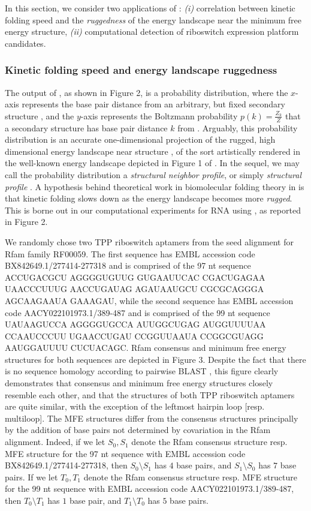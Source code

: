 In this section, we consider two applications of \fftbor:
{\em (i)} correlation between kinetic folding speed and the {\em ruggedness}
of the energy landscape near the minimum free energy structure,
{\em (ii)} computational detection of riboswitch
expression platform candidates.

\subsubsection*{Kinetic folding speed and energy landscape ruggedness}

The output of \fftbor, as shown in
Figure 2, is a probability distribution,
where the $x$-axis represents the base pair distance from an arbitrary,
but fixed secondary structure \strSt, and the $y$-axis represents the
Boltzmann probability $p(k) = \frac{Z_k}{Z}$ that a secondary structure
has base pair distance $k$ from \strSt. Arguably, this probability distribution
is an accurate one-dimensional projection of the rugged, high dimensional energy
landscape near structure \strSt,
of the sort artistically rendered in the well-known
energy landscape depicted in Figure 1  of \cite{Wolynes.ptam05}.
In the sequel, we may call the \fftbor probability distribution a
{\em structural neighbor profile}, or simply {\em structural profile}
\strSt.
A hypothesis behind theoretical work in biomolecular folding theory in
\cite{Bryngelson.p95}
is that kinetic folding slows down as the energy landscape becomes more
{\em rugged}. This is borne out in our computational experiments for RNA
using \fftbor, as reported
in Figure 2.

We randomly chose two TPP riboswitch
aptamers from the seed alignment for
Rfam family RF00059. The first sequence has EMBL accession code
BX842649.1/277414-277318 and is comprised of the 97 nt sequence
ACCUGACGCU AGGGGUGUUG GUGAAUUCAC CGACUGAGAA UAACCCUUUG AACCUGAUAG
AGAUAAUGCU CGCGCAGGGA AGCAAGAAUA GAAAGAU, while the second sequence
has EMBL accession code AACY022101973.1/389-487 and is comprised of the 99
nt sequence
UAUAAGUCCA AGGGGUGCCA AUUGGCUGAG AUGGUUUUAA CCAAUCCCUU
UGAACCUGAU CCGGUUAAUA CCGGCGUAGG AAUGGAUUUU CUCUACAGC.
Rfam consensus and minimum free energy structures for both sequences are
depicted in Figure 3.
Despite the fact that there is no sequence homology according to
pairwise BLAST \cite{BLAST}, this figure clearly demonstrates that
consensus and
minimum free energy structures closely resemble each other, and that the
structures of both TPP riboswitch aptamers are quite similar, with the
exception of the leftmost hairpin loop [resp. multiloop].
The MFE structures differ
from the consensus structures principally by the addition of base pairs not
determined by covariation in the Rfam alignment.
Indeed, if we let $S_0,S_1$
denote the Rfam consensus structure resp. MFE structure for the 97 nt
sequence with EMBL accession code BX842649.1/277414-277318, then
$S_0 \setminus S_1$ has $4$ base pairs, and $S_1\setminus S_0$ has $7$
base pairs. If we let $T_0,T_1$
denote the Rfam consensus structure resp. MFE structure for the 99 nt
sequence with EMBL accession code
AACY022101973.1/389-487, then
$T_0 \setminus T_1$ has $1$ base pair, and $T_1\setminus T_0$ has $5$
base pairs.

